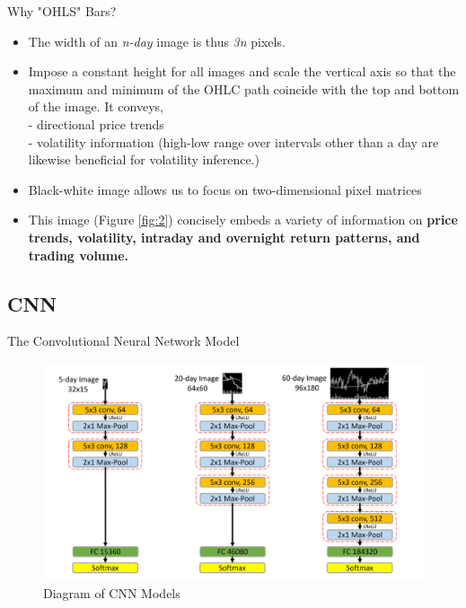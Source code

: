 \documentclass{beamer}
\begin{document}
\begin{frame}{Why "OHLS" Bars?}
    \begin{itemize}
        \item The width of an \textit{n-day} image is thus \textit{3n} pixels.
        \item Impose a constant height for all images and scale the vertical axis so that the maximum and minimum of the OHLC path coincide with the top and bottom of the image. It conveys,\\
        - directional price trends\\
        - volatility information (high-low range over intervals other than a day are likewise beneficial for volatility inference.)
        \item Black-white image allows us to focus on two-dimensional pixel matrices
        \item This image (Figure \ref{fig:2}) concisely embeds a variety of information on \textbf{price trends, volatility, intraday and overnight return patterns, and trading volume.}
    \end{itemize}
\end{frame}

\subsection{CNN}
\begin{frame}{The Convolutional Neural Network Model}
    \begin{figure}[h]
        \centering
        \includegraphics[width=\textwidth]{images/3 Diagram of CNN Models.png}
        \caption{Diagram of CNN Models}
        \label{fig:3}
    \end{figure}
\end{frame}
\end{document}
